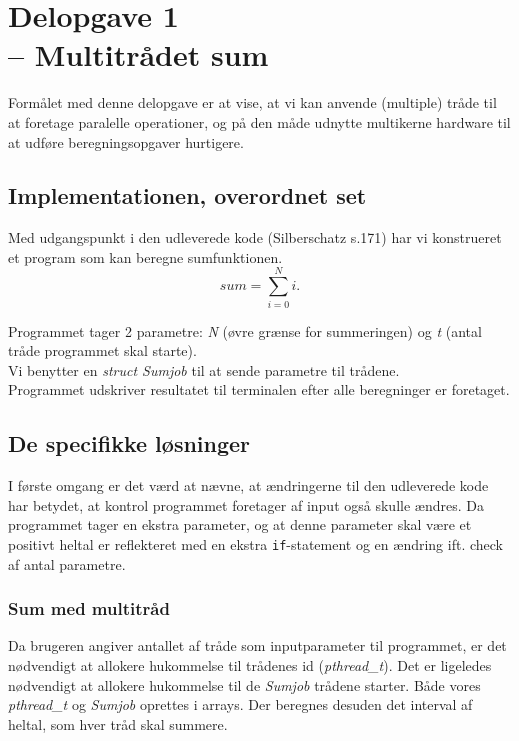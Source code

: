 \documentclass[main.tex]{subfile}
\begin{document}
\section{Delopgave 1\\\normalsize{-- Multitrådet sum}}
Formålet med denne delopgave er at vise, at vi kan anvende (multiple) tråde til at foretage paralelle operationer, og på den måde udnytte multikerne hardware til at udføre beregningsopgaver hurtigere.

\subsection{Implementationen, overordnet set}
Med udgangspunkt i den udleverede kode (Silberschatz s.171) har vi konstrueret et program som kan beregne sumfunktionen.
\begin{equation*}
sum = \sum_{i=0}^N i.
\end{equation*}

Programmet tager 2 parametre: \textit{N} (øvre grænse for summeringen) og \textit{t} (antal tråde programmet skal starte).\\

Vi benytter en \textit{struct Sumjob} til at sende parametre til trådene.\\

Programmet udskriver resultatet til terminalen efter alle beregninger er foretaget.

\subsection{De specifikke løsninger}
I første omgang er det værd at nævne, at ændringerne til den udleverede kode har betydet, at kontrol programmet foretager af input også skulle ændres. Da programmet tager en ekstra parameter, og at denne parameter skal være et positivt heltal er reflekteret med en ekstra \texttt{if}-statement og en ændring ift. check af antal parametre.

\subsubsection{Sum med multitråd}
Da brugeren angiver antallet af tråde som inputparameter til programmet, er det nødvendigt at allokere hukommelse til trådenes id (\textit{pthread\_t}). Det er ligeledes nødvendigt at allokere hukommelse til de \textit{Sumjob} trådene starter. Både vores \textit{pthread\_t} og \textit{Sumjob} oprettes i arrays. Der beregnes desuden det interval af heltal, som hver tråd skal summere.\\ 
\end{document}
